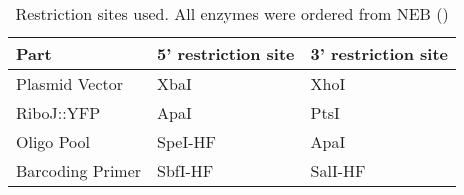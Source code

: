   

\begin{table}[]
\centering
\begin{tabular}{|l|l|l|}
\hline
Part             & 5' restriction site & 3' restriction site \\ \hline
Plasmid Vector   & XbaI                & XhoI                \\ \hline
RiboJ::YFP       & ApaI                & PtsI                \\ \hline
Oligo Pool       & SpeI-HF               & ApaI                \\ \hline
Barcoding Primer & SbfI-HF                & SalI-HF                \\ \hline
\end{tabular}
\caption{Restriction sites used. All enzymes were ordered from NEB ()}
\label{tab:re_sites}
\end{table}

